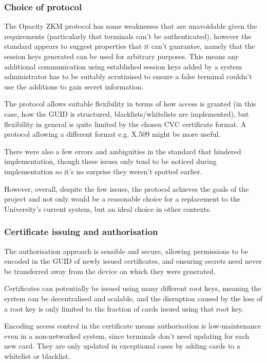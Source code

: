 \documentclass[12pt,a4paper]{article}
\begin{document}
\subsubsection{Choice of protocol}
The Opacity ZKM protocol has some weaknesses that are unavoidable given the requirements (particularly that terminals can't be authenticated), however the standard appears to suggest properties that it can't guarantee, namely that the session keys generated can be used for arbitrary purposes. This means any additional communication using established session keys added by a system administrator has to be suitably scrutinised to ensure a false terminal couldn't use the additions to gain secret information.

The protocol allows suitable flexibility in terms of how access is granted (in this case, how the GUID is structured, blacklists/whitelists are implemented), but flexibility in general is quite limited by the chosen CVC certificate format. A protocol allowing a different format e.g. X.509 might be more useful.

There were also a few errors and ambiguities in the standard that hindered implementation, though these issues only tend to be noticed during implementation so it's no surprise they weren't spotted earlier.

However, overall, despite the few issues, the protocol achieves the goals of the project and not only would be a reasonable choice for a replacement to the University's current system, but an ideal choice in other contexts.


\subsubsection{Certificate issuing and authorisation}
The authorisation approach is sensible and secure, allowing permissions to be encoded in the GUID of newly issued certificates, and ensuring secrets need never be transferred away from the device on which they were generated.

Certificates can potentially be issued using many different root keys, meaning the system can be decentralised and scalable, and the disruption caused by the loss of a root key is only limited to the fraction of cards issued using that root key.

Encoding access control in the certificate means authorisation is low-maintenance even in a non-networked system, since terminals don't need updating for each new card. They are only updated in exceptional cases by adding cards to a whitelist or blacklist.
\end{document}

